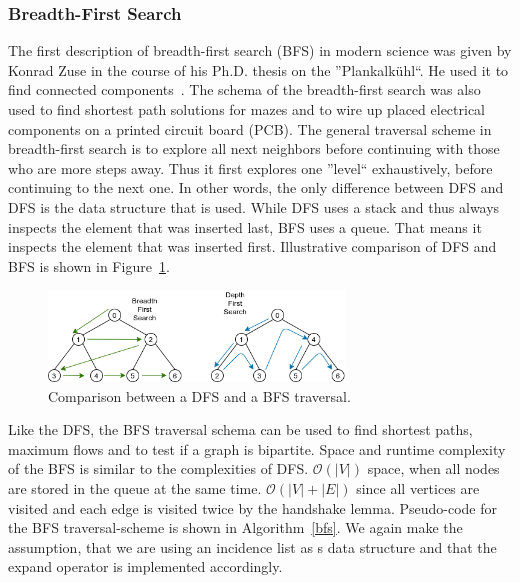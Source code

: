             \subsubsection*{Breadth-First Search} 
                The first description of breadth-first search (BFS) in modern science was given by Konrad Zuse in the course of his Ph.D. thesis on the ''Plankalkühl``. 
                He used it to find connected components~\autocite{zuse1948allgemeinen}. 
                The schema of the breadth-first search was also used to find shortest path solutions for mazes and to wire up placed electrical components on a printed circuit board (PCB).
                The general traversal scheme in breadth-first search is to explore all next neighbors before continuing with those who are more steps away. 
                Thus it first explores one ''level`` exhaustively, before continuing to the next one. 
                In other words, the only difference between DFS and DFS is the data structure that is used. While DFS uses a stack and thus always inspects the element that was inserted last, BFS uses a queue.
                That means it inspects the element that was inserted first.
                Illustrative comparison of DFS and BFS is shown in Figure~\ref{dfs-bfs}. 
                
                \begin{figure}[htp]
                \begin{center}
                \includegraphics[keepaspectratio,width=0.7\textwidth, height=0.3\textheight]{img/03-graphs/bfs-dfs.png}
                \end{center}
                \caption{Comparison between a DFS and a BFS traversal.}\label{dfs-bfs}
                \end{figure}
                
                Like the DFS, the BFS traversal schema can be used to find shortest paths, maximum flows and to test if a graph is bipartite. 
                Space and runtime complexity of the BFS is similar to the complexities of DFS. $\mathcal{O}(|V|)$ space, when all nodes are stored in the queue at the same time. 
                $\mathcal{O}(|V| + |E|)$ since all vertices are visited and each edge is visited twice by the handshake lemma. 
                Pseudo-code for the BFS traversal-scheme is shown in Algorithm~\ref{bfs}. 
                We again make the assumption, that we are using an incidence list as s data structure and that the expand operator is implemented accordingly.

